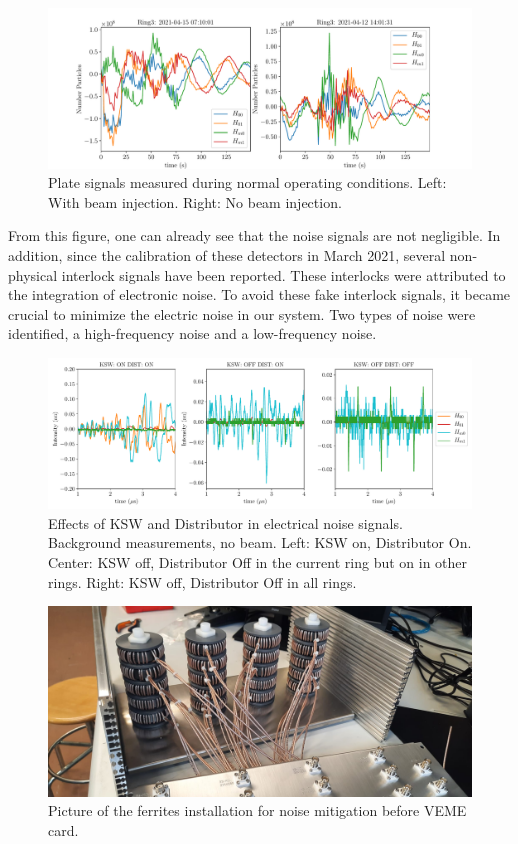 \begin{figure}[h]
    \centering
    \includegraphics[width=1.0\columnwidth]{Figure_NoiseProblems/NoiseProblem.pdf}
    \caption{Plate signals measured during normal operating conditions. Left: With beam injection. Right: No beam injection. }
    \label{fig:Noise}
\end{figure}

From this figure, one can already see that the noise signals are not negligible. In addition, since the calibration of these detectors in March 2021, several non-physical interlock signals have been reported. These interlocks were attributed to the integration of electronic noise. To avoid these fake interlock signals, it became crucial to minimize the electric noise in our system. Two types of noise were identified, a high-frequency noise and a low-frequency noise. 

\begin{figure}[h]
    \centering
    \includegraphics[width=1.0\columnwidth]{Figure_KSWandDISTeffect/KswDistEffect.pdf}
    \caption{Effects of KSW and Distributor in electrical noise signals. Background measurements, no beam. Left: KSW on, Distributor On. Center: KSW off, Distributor Off in the current ring but on in other rings. Right: KSW off, Distributor Off in all rings. }
    \label{fig:KSWandDist}
\end{figure}

\begin{figure}[h]
    \centering
    \includegraphics[width=0.8\columnwidth]{Figure_Ferrites/PictureFerrites.jpg}
    \caption{Picture of the ferrites installation for noise mitigation before \hzhm VEME card. }
    \label{fig:Ferrites}
\end{figure}

